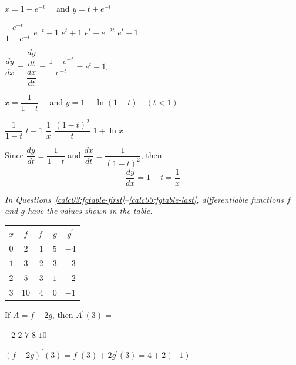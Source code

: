 \question
$x=1-e^{-t} \quad$ and $y=t+e^{-t}$
\begin{choices}
  \choice $\dfrac{e^{-t}}{1-e^{-t}}$
  \choice $e^{-t}-1$
  \choice $e^{t}+1$
  \choice $e^{t}-e^{-2 t}$
  \CorrectChoice $e^{t}-1$
\end{choices}
\begin{solution}
$\dfrac{d y}{d x}=\dfrac{\dfrac{d y}{d t}}{\dfrac{d x}{d t}}=\dfrac{1-e^{-t}}{e^{-t}}=e^{t}-1$.
\end{solution}





\newpage




\question\label{calc03:param-last}
$x=\dfrac{1}{1-t} \quad$ and $y=1-\ln (1-t) \quad(t<1)$
\begin{choices}
  \choice $\dfrac{1}{1-t}$
  \choice $t-1$
  \CorrectChoice $\dfrac{1}{x}$
  \choice $\dfrac{(1-t)^{2}}{t}$
  \choice $1+\ln x$
\end{choices}
\begin{solution}
Since $\dfrac{d y}{d t}=\dfrac{1}{1-t}$ and $\dfrac{d x}{d t}=\dfrac{1}{(1-t)^{2}}$, then
\[
\dfrac{d y}{d x}=1-t=\dfrac{1}{x}
\]
\end{solution}





\newpage

\begin{EnvFullwidth}
\textit{In Questions~\ref{calc03:fgtable-first}--\ref{calc03:fgtable-last}, differentiable functions $f$ and $g$ have the values shown in the table.}
\begin{center}
\begin{tabular}{c|c|c|c|c}
$x$ & $f$ & $f^{\prime}$ & $g$ & $g^{\prime}$ \\
\hline
$0$ & $2$ & $1$ & $5$ & $-4$ \\
\hline
$1$ & $3$ & $2$ & $3$ & $-3$ \\
\hline
$2$ & $5$ & $3$ & $1$ & $-2$ \\
\hline
$3$ & $10$ & $4$ & $0$ & $-1$ \\
\hline
\end{tabular}
\end{center}
\end{EnvFullwidth}

\question\label{calc03:fgtable-first}
If $A=f+2 g$, then $A^{\prime}(3)=$
\begin{choices}
  \choice $-2$
  \CorrectChoice $2$
  \choice $7$
  \choice $8$
  \choice $10$
\end{choices}
\begin{solution}
$(f+2 g)^{\prime}(3)=f^{\prime}(3)+2 g^{\prime}(3)=4+2(-1)$
\end{solution}

